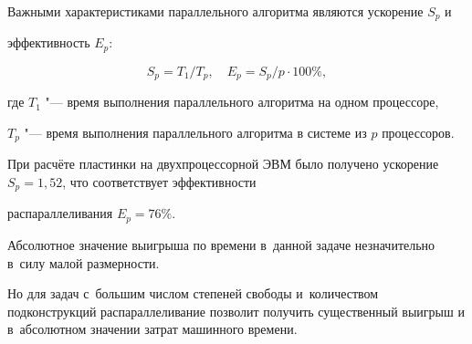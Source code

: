 \smallskip



Важными характеристиками параллельного алгоритма являются ускорение $S_p$ и

эффективность $E_p$:

$$ S_p ={T_1}/{T_p}, \quad E_p ={S_p}/{p} \cdot 100\%, $$

где $T_1 $ "--- время выполнения параллельного алгоритма на одном процессоре,

$T_p $ "--- время выполнения параллельного алгоритма в системе из $p$ процессоров. 

При расчёте пластинки на двухпроцессорной ЭВМ было получено ускорение $S_p =1,52$, что соответствует эффективности 

распараллеливания $E_p =76\% $. 

Абсолютное значение выигрыша по времени в~данной задаче незначительно в~силу малой размерности. 

Но для задач с~большим числом степеней свободы и~количеством подконструкций распараллеливание позволит получить существенный выигрыш и в~абсолютном значении затрат машинного времени.










